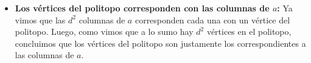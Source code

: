 \begin{itemize}
\begin{itemize}
\item \textbf{Los vértices del politopo corresponden con las columnas de $a$:}
Ya vimos que las $d^2$ columnas de $a$ corresponden cada una con un 
vértice del politopo. Luego, como vimos que a lo sumo
hay $d^2$ vértices en el politopo, concluimos
que los vértices del politopo son justamente los correspondientes
a las columnas de $a$.
\end{itemize}

\end{itemize}